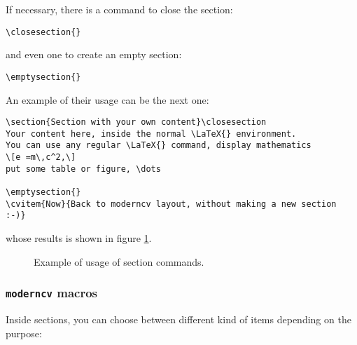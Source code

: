 \documentclass[a4paper,11pt]{article}
\begin{document}
If necessary, there is a command to close the section: 

\begin{verbatim}
\closesection{}
\end{verbatim}

and even one to create an empty section:

\begin{verbatim}
\emptysection{}
\end{verbatim}

An example of their usage can be the next one:

\begin{verbatim}
\section{Section with your own content}\closesection
Your content here, inside the normal \LaTeX{} environment. 
You can use any regular \LaTeX{} command, display mathematics
\[e =m\,c^2,\]
put some table or figure, \dots

\emptysection{}
\cvitem{Now}{Back to moderncv layout, without making a new section :-)}
\end{verbatim}

whose results is shown in figure \ref{fig:ex_sec}.

\begin{figure}[!ht]
 \centering
 \caption{Example of usage of section commands.}
 \label{fig:ex_sec}
\end{figure}

\subsubsection{\texttt{moderncv} macros}

Inside sections, you can choose between different kind of items depending on the purpose:
\end{document}
